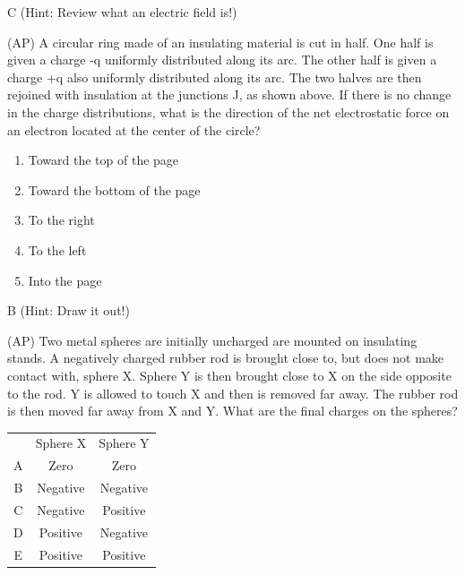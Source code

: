 \begin{solution}
C (Hint: Review what an electric field is!)
\end{solution}


\begin{question}
(AP) A circular ring made of an insulating material is cut in half.  One half is given a charge -q uniformly distributed along its arc.  The other half is given a charge +q also uniformly distributed along its arc.  The two halves are then rejoined with insulation at the junctions J, as shown above.  If there is no change in the charge distributions, what is the direction of the net electrostatic force on an electron located at the center of the circle? 
\begin{enumerate}[label=(\alph*)]
    \item Toward the top of the page
    \item Toward the bottom of the page
    \item To the right
    \item To the left
    \item Into the page
\end{enumerate}

\end{question}

\begin{solution}
B (Hint: Draw it out!)
\end{solution}


\begin{question}
(AP) Two metal spheres are initially uncharged are mounted on insulating stands. A negatively charged rubber rod is brought close to, but does not make contact with, sphere X. Sphere Y is then brought close to X on the side opposite to the rod. Y is allowed to touch X and then is removed far away. The rubber rod is then moved far away from X and Y. What are the final charges on the spheres?

\begin{center}
\begin{tabular}{ |c|c|c| } 
 \hline
       & Sphere X & Sphere Y \\ 
 A      & Zero  & Zero  \\ 
 B      & Negative  & Negative  \\ 
 C      & Negative  & Positive  \\ 
 D      & Positive  & Negative  \\ 
 E      & Positive  & Positive  \\ 

 \hline
\end{tabular}
\end{center}

\end{question}

